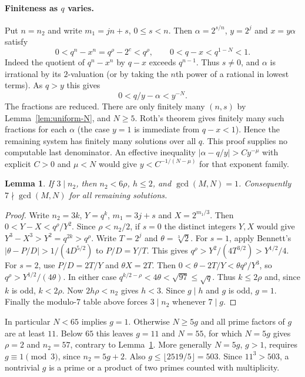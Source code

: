 \documentclass[11pt]{article}
\newtheorem{lemma}{Lemma}
\begin{document}
\paragraph{Finiteness as $q$ varies.}
Put $n=n_2$ and write $m_1=jn+s$, $0\le s<n$. Then
$\alpha=2^{s/n}$, $y=2^j$ and $x=y\alpha$ satisfy
\[
 0<q^n-x^n=q^\rho-2^c<q^\rho,
 \qquad 0<q-x<q^{1-N}<1.
\]
Indeed the quotient of $q^n-x^n$ by $q-x$ exceeds $q^{n-1}$.
Thus $s\ne0$, and $\alpha$ is irrational by its $2$-valuation
(or by taking the $n$th power of a rational in lowest terms).
As $q>y$ this gives
\[
 0<q/y-\alpha<y^{-N}.
\]
The fractions are reduced. There are only finitely many $(n,s)$
by Lemma~\ref{lem:uniform-N}, and $N\ge5$. Roth's theorem
\cite{Roth1955} gives finitely many such fractions for each
$\alpha$ (the case $y=1$ is immediate from $q-x<1$).
Hence the remaining system has finitely many solutions over all $q$.
This proof supplies no computable last denominator. An effective
inequality $|\alpha-q/y|>C y^{-\mu}$ with explicit $C>0$ and
$\mu<N$ would give $y<C^{-1/(N-\mu)}$ for that exponent family.

\begin{lemma}\label{lem:cubic-large-exponent}
If $3\mid n_2$, then $n_2<6\rho$, $h\le2$, and $\gcd(M,N)=1$.
Consequently $7\nmid\gcd(M,N)$ for all remaining solutions.
\end{lemma}
\begin{proof}
Write $n_2=3k$, $Y=q^k$, $m_1=3j+s$ and $X=2^{m_1/3}$.
Then $0<Y-X<q^\rho/Y^2$. Since $\rho<n_2/2$,
if $s=0$ the distinct integers $Y,X$ would give
$Y^3-X^3>Y^2=q^{2k}>q^\rho$.
Write $T=2^j$ and $\theta=\sqrt[3]2$. For $s=1$, apply Bennett's
$|\theta-P/D|>1/(4D^{5/2})$ \cite[eq.~(4)]{BennettCubic}
to $P/D=Y/T$. This gives
$q^\rho>Y^2/(4T^{3/2})>Y^{1/2}/4$.
For $s=2$, use $P/D=2T/Y$ and $\theta X=2T$. Then
$0<\theta-2T/Y<\theta q^\rho/Y^3$, so
$q^\rho>Y^{1/2}/(4\theta)$.
In either case $q^{k/2-\rho}<4\theta<\sqrt{97}\le\sqrt q$.
Thus $k\le2\rho$ and, since $k$ is odd, $k<2\rho$.
Now $2h\rho<n_2$ gives $h<3$. Since $g\mid h$ and $g$ is odd,
$g=1$. Finally the modulo-$7$ table above forces $3\mid n_2$
whenever $7\mid g$.
\end{proof}
In particular $N<65$ implies $g=1$. Otherwise $N\ge5g$ and all
prime factors of $g$ are at least $11$. Below $65$ this leaves
$g=11$ and $N=55$, for which $N=5g$ gives $\rho=2$ and $n_2=57$,
contrary to Lemma~\ref{lem:cubic-large-exponent}. More generally
$N=5g$, $g>1$, requires $g\equiv1\pmod3$, since $n_2=5g+2$.
Also $g\le\lfloor2519/5\rfloor=503$. Since $11^3>503$, a
nontrivial $g$ is a prime or a product of two primes counted
with multiplicity.
\end{document}
